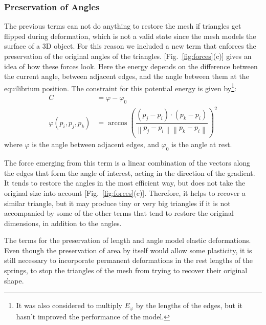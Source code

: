 \documentclass[journal]{IEEEtran}
\newcommand{\fref}[1]{Fig.~\ref{#1}}
\begin{document}
\subsubsection{Preservation of Angles}
The previous terms can not do anything to restore the mesh if triangles get flipped during deformation, which is not a valid state since the mesh models the surface of a 3D object.  For this reason we included a new term that enforces the preservation of the original angles of the triangles.  [\fref{fig:forces}(c)] gives an idea of how these forces look.  Here the energy depends on the difference between the current angle, between adjacent edges, and the angle between them at the equilibrium position. The constraint for this potential energy is given by\footnote{It was also considered to multiply $E_\varphi$ by the lengths of the edges, but it hasn't improved the performance of the model.}:
\begin{align}
 C &= \varphi - \varphi_0 \\
 \varphi(p_i,p_j,p_k) & = \arccos \left( \dfrac{(p_j - p_i) \cdot (p_k - p_i)}{ \left\| p_j - p_i \right\| \left\|p_k - p_i \right\|} \right)^2 \nonumber
\end{align}
where $\varphi$ is the angle between adjacent edges, and $\varphi_0$ is the angle at rest.  %

The force emerging from this term is a linear combination of the vectors along the edges that form the angle of interest, acting in the direction of the gradient.  It tends to restore the angles in the most efficient way, but does not take the original size into account [\fref{fig:forces}(c)].  Therefore, it helps to recover a similar triangle, but it may produce tiny or very big triangles if it is not accompanied by some of the other terms that tend to restore the original dimensions, in addition to the angles.

\vspace*{1em}
The terms for the preservation of length and angle model elastic deformations.  Even though the preservation of area by itself would allow some plasticity, it is still necessary to incorporate permanent deformations in the rest lengths of the springs, to stop the triangles of the mesh from trying to recover their original shape.
\end{document}
